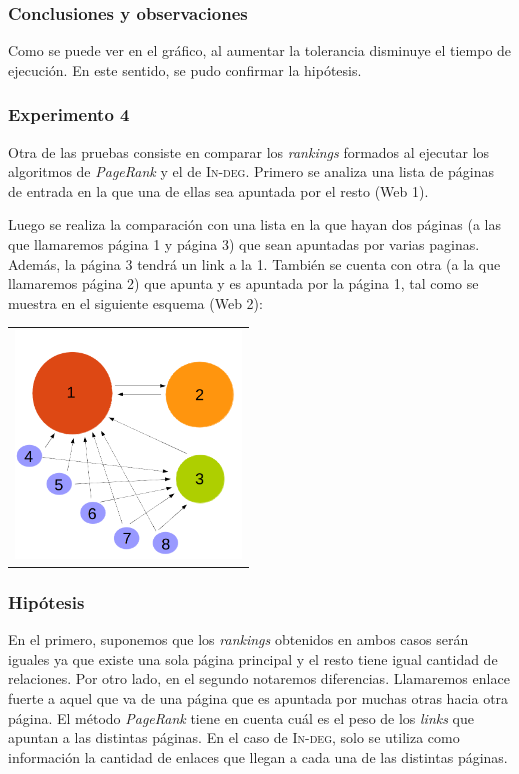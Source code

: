 			\subsubsection*{Conclusiones y observaciones}
			Como se puede ver en el gráfico, al aumentar la tolerancia disminuye el tiempo de ejecución. En este sentido, se pudo confirmar la hipótesis.  

		\subsubsection{Experimento 4}
		Otra de las pruebas consiste en comparar los \emph{rankings} formados al ejecutar los algoritmos de \emph{PageRank} y el de \textsc{In-deg}. Primero se analiza una lista de páginas de entrada en la que una de ellas sea apuntada por el resto (Web 1). 

		Luego se realiza la comparación con una lista en la que hayan dos páginas (a las que llamaremos página 1 y página 3) que sean apuntadas por varias paginas. Además, la página 3 tendrá un link a la 1. También se cuenta con otra (a la que llamaremos página 2) que apunta y es apuntada por la página 1, tal como se muestra en el siguiente esquema (Web 2):

				{\centering \begin{tabular}{c}
			      \includegraphics[width=6cm]{../../src/exp/graficos/exp4-graph.png} \\
			    \end{tabular}}

			\subsubsection*{Hipótesis} 
			En el primero, suponemos que los \emph{rankings} obtenidos en ambos casos serán iguales ya que existe una sola página principal y el resto tiene igual cantidad de relaciones. Por otro lado, en el segundo notaremos diferencias. Llamaremos enlace fuerte a aquel que va de una página que es apuntada por muchas otras hacia otra página. El método \emph{PageRank} tiene en cuenta cuál es el peso de los \emph{links} que apuntan a las distintas páginas. En el caso de \textsc{In-deg}, solo se utiliza como información la cantidad de enlaces que llegan a cada una de las distintas páginas.

